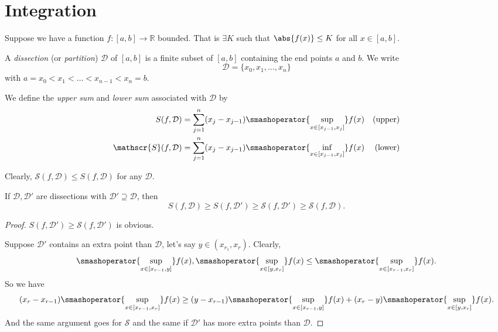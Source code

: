 \section{Integration}
Suppose we have a function \(f: [a, b] \to \mathbb{R}\) bounded. That is \(\exists K\) such that \(\abs{f(x)} \leq K\) for all \(x \in [a,b]\).
\begin{definition}{}{}
    A \textit{dissection} (or \textit{partition}) \(\mathcal{D}\) of \([a,b]\) is a finite subset of \([a,b]\) containing the end points \(a\) and \(b\). We write
    \[\mathcal{D} = \{x_0,x_1,\dots,x_n\}\]
    with \(a = x_0 < x_1 < \dots < x_{n-1} < x_n = b\).
\end{definition}
\begin{definition}{}{}
    We define the \textit{upper sum} and \textit{lower sum} associated with \(\mathcal{D}\) by
    \begin{align*}
        S(f,\mathcal{D}) &= \sum_{j=1}^{n}(x_{j}-x_{j-1}) \smashoperator{\sup_{x \in [x_{j-1},x_j]}} f(x) &\text{(upper)}\\
        \mathscr{S}(f,\mathcal{D}) &= \sum_{j=1}^{n}(x_{j}-x_{j-1}) \smashoperator{\inf_{x \in [x_{j-1},x_j]}} f(x)&\text{(lower)}
    \end{align*}
\end{definition}
Clearly, \(\mathscr{S}(f,\mathcal{D}) \leq S(f,\mathcal{D})\) for any \(\mathcal{D}\).
\begin{lemma}{}{}
    If \(\mathcal{D}, \mathcal{D}'\) are dissections with \(\mathcal{D}'\supseteq\mathcal{D}\), then
    \[
        S(f,\mathcal{D}) \geq S(f,\mathcal{D}')\geq \mathscr{S}(f,\mathcal{D}') \geq \mathscr{S}(f,\mathcal{D}).
    \]
\end{lemma}
\begin{proof}
    \(S(f,\mathcal{D}')\geq \mathscr{S}(f,\mathcal{D}')\) is obvious.

    Suppose \(\mathcal{D}'\) contains an extra point than \(\mathcal{D}\), let's say \(y \in (x_{r_1},x_r)\). Clearly,
    \[
        \smashoperator{\sup_{x\in [x_{r-1},y]}}f(x),\smashoperator{\sup_{x\in [y,x_r]}}f(x) \leq \smashoperator{\sup_{x\in [x_{r-1},x_r]}}f(x).
    \]
    So we have
    \[
        (x_r - x_{r-1})\smashoperator{\sup_{x\in[x_{r-1},x_r]}}f(x)\geq (y - x_{r-1})\smashoperator{\sup_{x\in[x_{r-1},y]}}f(x)+(x_r - y)\smashoperator{\sup_{x\in[y,x_r]}}f(x).
    \]
    And the same argument goes for \(\mathscr{S}\) and the same if \(\mathcal{D}'\) has more extra points than \(\mathcal{D}\).
\end{proof}
